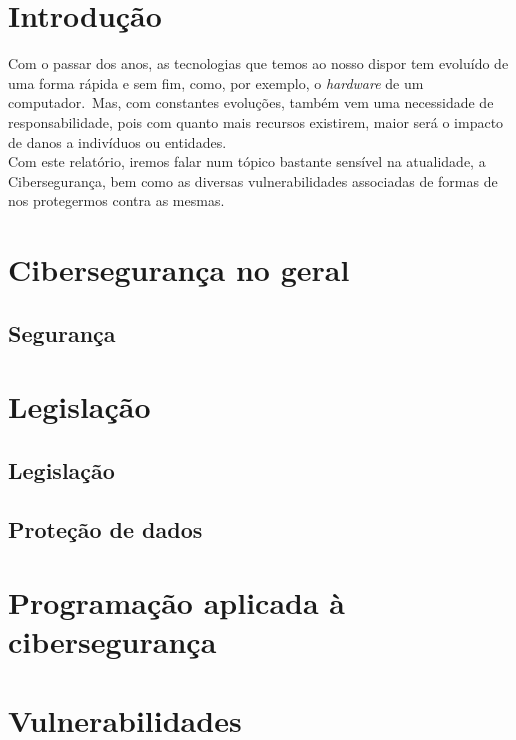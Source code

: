 \documentclass{report}
\begin{document}
\tableofcontents


\clearpage
{}

\chapter*{Introdução}
\label{chap.introducao}

Com o passar dos anos, as tecnologias que temos ao nosso dispor tem evoluído de uma forma rápida e sem fim, como, por exemplo, o \textit{hardware} de um computador.\ Mas, com constantes evoluções, também vem uma necessidade de responsabilidade, pois com quanto mais recursos existirem, maior será o impacto de danos a indivíduos ou entidades.\\

Com este relatório, iremos falar num tópico bastante sensível na atualidade, a Cibersegurança, bem como as diversas vulnerabilidades associadas de formas de nos protegermos contra as mesmas.

\chapter{Cibersegurança no geral}
\label{chap.cibersegurancanogeral}
\section{Segurança}

\chapter{Legislação}
\label{chap.legislacao}
\section{Legislação}
\section{Proteção de dados}

\chapter{Programação aplicada à cibersegurança}
\label{chap.programacao}

\chapter{Vulnerabilidades}
\label{chap.vulnerabilidade}
\end{document}

